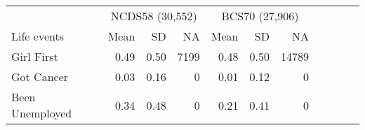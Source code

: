 \begin{tabular}{lrrrrrrrrrr}
\toprule
\multicolumn{1}{c}{} & \multicolumn{3}{c}{NCDS58 (30,552)} & \multicolumn{3}{c}{BCS70 (27,906)} \\
\cmidrule(l{3pt}r{3pt}){2-4} \cmidrule(l{3pt}r{3pt}){5-7}
Life events & Mean & SD & NA & Mean & SD & NA\\
\midrule
Girl First & 0.49 & 0.50 & 7199 & 0.48 & 0.50 & 14789\\
Got Cancer & 0.03 & 0.16 & 0 & 0.01 & 0.12 & 0\\
Been Unemployed & 0.34 & 0.48 & 0 & 0.21 & 0.41 & 0\\
\bottomrule
\end{tabular}